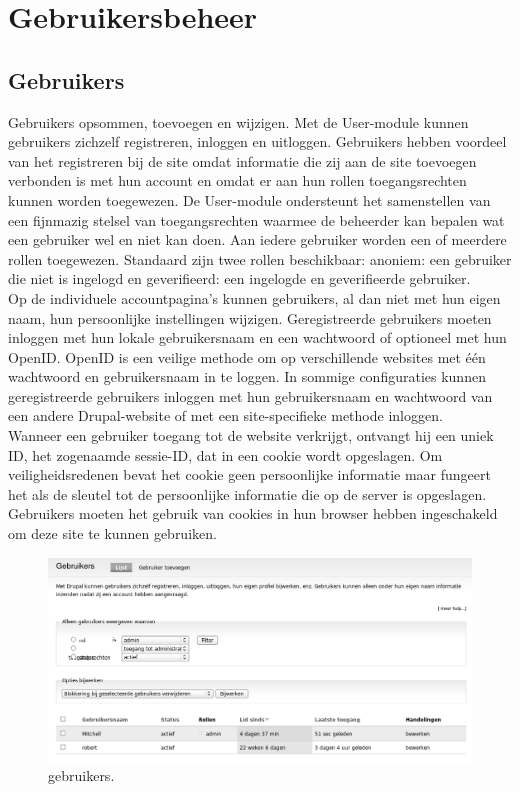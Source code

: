\chapter{Gebruikersbeheer} 

\section{Gebruikers}
    Gebruikers opsommen, toevoegen en wijzigen.
 Met de User-module  kunnen gebruikers zichzelf registreren,
 inloggen en uitloggen. Gebruikers hebben voordeel van het registreren bij de site omdat informatie die 
 zij aan de site toevoegen verbonden is met hun account en omdat er aan hun rollen 
 toegangsrechten kunnen worden toegewezen. De User-module ondersteunt het samenstellen 
 van een fijnmazig stelsel van toegangsrechten waarmee de beheerder kan bepalen wat 
 een gebruiker wel en niet kan doen. Aan iedere gebruiker worden een of meerdere rollen 
 toegewezen. Standaard zijn twee rollen beschikbaar: anoniem: een gebruiker die niet is 
 ingelogd en geverifieerd: een ingelogde en geverifieerde gebruiker.
\\
Op de individuele accountpagina's kunnen gebruikers, al dan niet met hun eigen naam, 
hun persoonlijke instellingen wijzigen. Geregistreerde gebruikers moeten inloggen met 
hun lokale gebruikersnaam en een wachtwoord of optioneel met hun OpenID. OpenID is een 
veilige methode om op verschillende websites met \'e\'en wachtwoord en
gebruikersnaam in te loggen. In sommige configuraties kunnen geregistreerde gebruikers inloggen met hun 
gebruikersnaam en wachtwoord van een andere Drupal-website of met een site-specifieke methode inloggen.
\\
Wanneer een gebruiker toegang tot de website verkrijgt, ontvangt hij een uniek ID, 
het zogenaamde sessie-ID, dat in een cookie wordt opgeslagen. 
Om veiligheidsredenen bevat het cookie geen persoonlijke informatie maar fungeert 
het als de sleutel tot de persoonlijke informatie die op de server is opgeslagen. 
Gebruikers moeten het gebruik van cookies in hun browser hebben ingeschakeld om deze site te kunnen gebruiken.   
\begin{figure}[!h]
    \centering
   \includegraphics[scale=0.3,angle=0]{gebruikers}
   \caption{gebruikers.\label{white}}
 \end{figure}    
    
